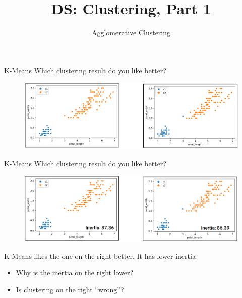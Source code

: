 \documentclass[aspectratio=169]{../latex_main/tntbeamer}  %
\title[Introduction]{DS: Clustering, Part 1}
\subtitle{Agglomerative Clustering}
\begin{document}
	
	\maketitle
	\begin{frame}{K-Means}
	    Which clustering result do you like better? 
	    \begin{figure}
	        \centering
	        \includegraphics[scale=.4]{Bild27}
	    \end{figure}
	\end{frame}
	
	
	\begin{frame}{K-Means}
	    Which clustering result do you like better? 
	    \begin{figure}
	        \centering
	        \includegraphics[scale=.35]{Bild28}
	    \end{figure}
	    K-Means likes the one on the right better. It has lower inertia
	    \begin{itemize}
	        \item Why is the inertia on the right lower?
	        \item Is clustering on the right “wrong”?
	    \end{itemize}
	\end{frame}
	
	
	
\end{document}
